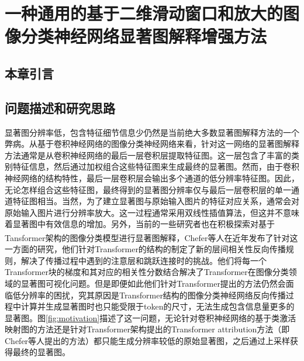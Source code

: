 



\chapter{一种通用的基于二维滑动窗口和放大的图像分类神经网络显著图解释增强方法}
\thispagestyle{others}
\pagestyle{others}
\xiaosi

\section{本章引言}



\section{问题描述和研究思路}

显著图分辨率低，包含特征细节信息少仍然是当前绝大多数显著图解释方法的一个弊病。从基于卷积神经网络的图像分类神经网络来看，针对这一网络的显著图解释方法通常是从卷积神经网络的最后一层卷积层提取特征图。这一层包含了丰富的类别特征信息，然后通过加权组合这些特征图来生成最终的显著图。然而，由于卷积神经网络的结构特性，最后一层卷积层会输出多个通道的低分辨率特征图。因此，无论怎样组合这些特征图，最终得到的显著图分辨率仅与最后一层卷积层的单一通道特征图相当。当然，为了建立显著图与原始输入图片的特征对应关系，通常会对原始输入图片进行分辨率放大。这一过程通常采用双线性插值算法，但这并不意味着显著图中有效信息的增加。另外，当前的一些研究者也在积极探索对基于Tansformer架构的图像分类模型进行显著图解释，Chefer等人\textsuperscript{\cite{chefer2021transformer}}在近年发布了针对这一方面的研究，他们针对Transformer的结构的制定了新的层间相关性反向传播规则，解决了传播过程中遇到的注意层和跳跃连接时的挑战。他们将每一个Transformer块的梯度和其对应的相关性分数结合解决了Transformer在图像分类领域的显著图可视化问题。但是即便如此他们针对Transformer提出的方法仍然会面临低分辨率的困扰，究其原因是Transformer结构的图像分类神经网络反向传播过程中计算并生成显著图时也只能受限于token的尺寸，无法生成包含信息量更多的显著图。图\ref{fig:motivation}描述了这一问题，无论针对卷积神经网络的基于类激活映射图的方法还是针对Transformer架构提出的Transformer attribution方法（即Chefer等人提出的方法）都只能生成分辨率较低的原始显著图，之后通过上采样获得最终的显著图。

